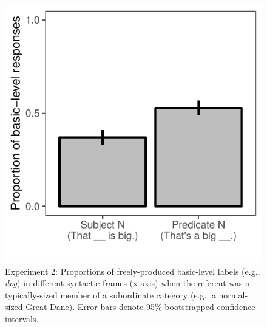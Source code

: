 \documentclass[10pt,letterpaper]{article}
\begin{document}
\begin{figure}[t]
\begin{center}
\includegraphics[width=0.7\linewidth]{expt-np-prod-prereg-bars-revised.pdf}
\end{center}
\caption{Experiment 2: Proportions of freely-produced basic-level labels (e.g., \emph{dog}) in different syntactic frames (x-axis) when the referent was a typically-sized member of a subordinate category (e.g., a normal-sized Great Dane). Error-bars denote 95\% bootstrapped confidence intervals.}
\label{np-production}
\end{figure}
\end{document}
